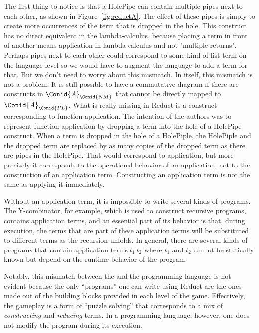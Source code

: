 The first thing to notice is that a HolePipe can contain multiple pipes next to each other,
as shown in Figure~\ref{fig:reductA}.
The effect of these
pipes is simply to create more occurrences of the term that is dropped in the hole.
This construct has no direct equivalent in the lambda-calculus, because
placing a term in front of another means application in lambda-calculus
and not "multiple returns".
%
Perhaps pipes next to each other could correspond to some kind of list term on the language level
so we would have to augment the language to add a term for that.
%
But we don't need to worry about this mismatch.
%
In itself, this mismatch is not a problem.
It is still possible to have a commutative diagram if there are constructs in \ensuremath{\Conid{A}_{\Conid{NM}}} that cannot be directly mapped to \ensuremath{\Conid{A}_{\Conid{PL}}}.
%
What is really missing in Reduct is a construct corresponding to function application.
The intention of the authors was to represent function application by dropping a term into the hole of a HolePipe construct.
%
When a term is dropped in the hole of a HolePiple, the HolePiple and the dropped term are replaced by as many copies of the dropped term as there are pipes in the HolePipe.
That would correspond to application, but more precisely it corresponds to the operational behavior of an application, not to the construction of an application term.
Constructing an application term is not the same as applying it immediately.
%

Without an application term, it is impossible to write several kinds of programs.
The Y-combinator, for example, which is used to construct recursive programs,
contains application terms, and
an essential part of its behavior is that, during execution,
the terms that are part of these application terms will be substituted to different terms as the recursion unfolds.
%
In general,
there are several kinds of programs that contain application terms $t_1\ t_2$ where $t_1$ and $t_2$
cannot be statically known but depend on the runtime behavior of the program.

Notably, this mismatch between the \nm{} and the programming language is not evident 
because the only ``programs'' one can write using Reduct
are the ones made out of the building blocks provided in each level of the game.
Effectively, the gameplay is a form of ``puzzle solving'' that corresponds to a mix of \emph{constructing} and \emph{reducing} terms.
In a programming language, however, one does not modify the program during its execution.

